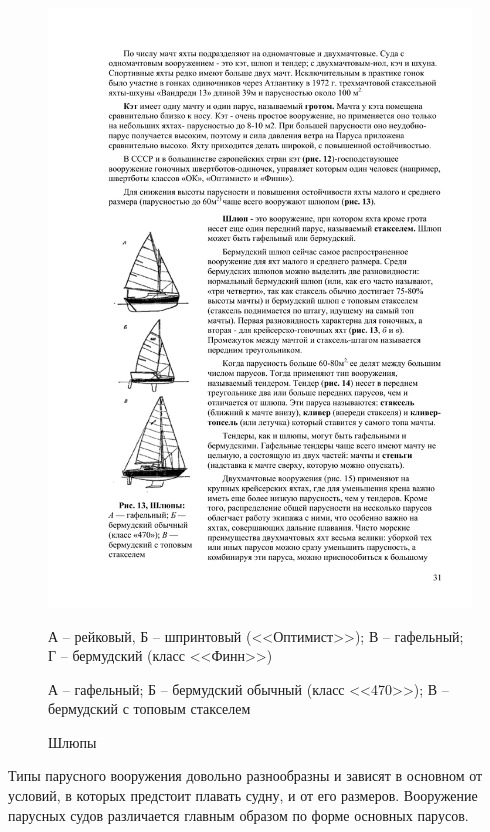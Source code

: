 \documentclass[a4paper, 12pt, twoside, final]{scrbook}
\begin{document}
\begin{figure}[htbp]
\begin{minipage}[b]{0.49\textwidth}
		\centering\includegraphics{pics/Shlyupy}
		\caption{Шлюпы}
		\label{fig:13}
	\end{minipage}
	\par
	\smallskip
	\begin{minipage}[b]{0.49\textwidth}
		\centering\small
		А \--- рейковый,
		Б \--- шпринтовый (<<Оптимист>>);
		В \--- гафельный;
		Г \--- бермудский (класс <<Финн>>)
	\end{minipage}
	\hfil\hfil%
	\begin{minipage}[b]{0.49\textwidth}
		\centering\small
		А \--- гафельный;
		Б \--- бермудский обычный (класс <<470>>);
		В \--- бермудский с топовым стакселем
	\end{minipage}
\end{figure}


Типы парусного вооружения довольно разнообразны и зависят в основном
от условий, в которых предстоит плавать судну, и от его размеров.
Вооружение парусных судов различается главным образом по форме основных
парусов.
\end{document}
